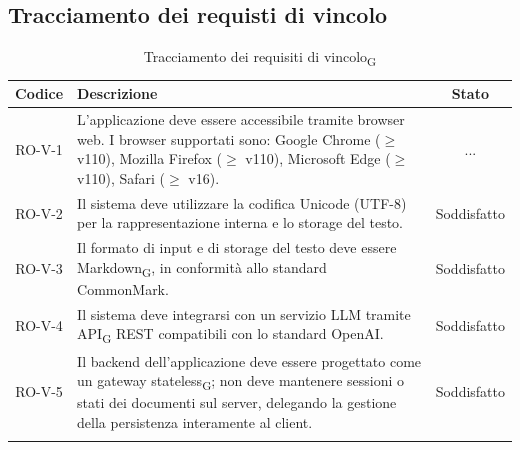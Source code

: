 \documentclass[11pt,a4paper]{article}
\newcommand{\gls}[1]{#1\textsubscript{G}}
\begin{document}
\subsection{Tracciamento dei requisti di vincolo}
\begin{longtable}{|c|p{11cm}|c|}
\hline
\textbf{Codice} & \textbf{Descrizione} & \textbf{Stato}\\
\hline
\endhead
RO-V-1 & L'applicazione deve essere accessibile tramite browser web. 
I browser supportati sono: Google Chrome ($\geq$ v110), Mozilla Firefox 
($\geq$ v110), Microsoft Edge ($\geq$ v110), Safari ($\geq$ v16). & ... \\
\hline
RO-V-2 & Il sistema deve utilizzare la codifica Unicode (UTF-8) per la rappresentazione interna e lo storage del testo. & Soddisfatto \\
\hline
RO-V-3 & Il formato di input e di storage del testo deve essere \gls{Markdown}, in conformità allo standard CommonMark. & Soddisfatto\\
\hline
RO-V-4 & Il sistema deve integrarsi con un servizio LLM tramite \gls{API} REST compatibili con lo standard OpenAI. & Soddisfatto \\
\hline
RO-V-5 & Il backend dell'applicazione deve essere progettato come un gateway \gls{stateless}; non deve mantenere sessioni o stati dei documenti sul server, delegando la gestione della persistenza interamente al client. & Soddisfatto \\
\hline
\addlinespace[1em]
\caption{Tracciamento dei \gls{requisiti di vincolo}}
\label{tab:tracciamento_requisiti_vincolo}
\end{longtable}
\end{document}
